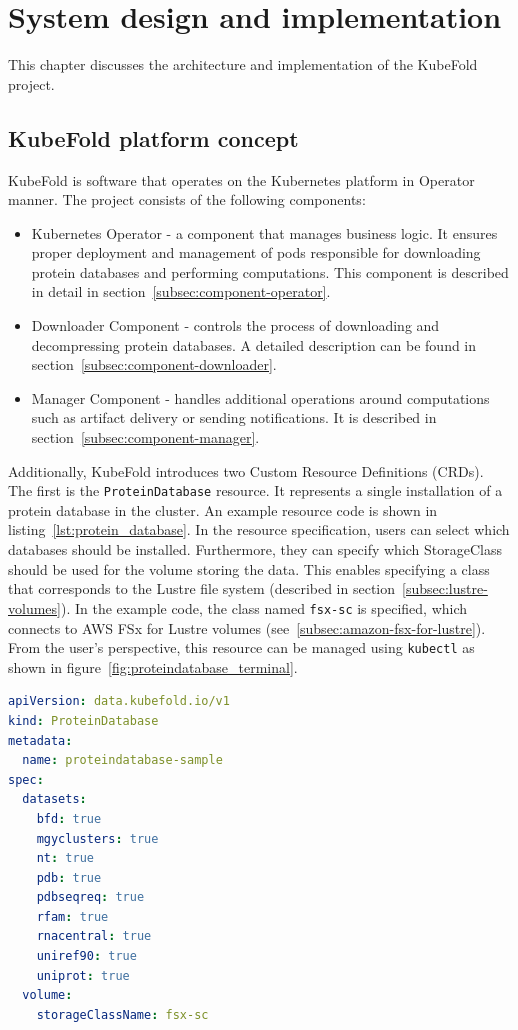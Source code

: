 \chapter{System design and implementation}
This chapter discusses the architecture and implementation of the KubeFold project.


\section{KubeFold platform concept}
KubeFold is software that operates on the Kubernetes platform in Operator manner.
The project consists of the following components:
\begin{itemize}
    \item Kubernetes Operator - a component that manages business logic.
    It ensures proper deployment and management of pods responsible for downloading protein databases and performing computations.
    This component is described in detail in section~\ref{subsec:component-operator}.
    \item Downloader Component - controls the process of downloading and decompressing protein databases.
    A detailed description can be found in section~\ref{subsec:component-downloader}.
    \item Manager Component - handles additional operations around computations such as artifact delivery or sending notifications.
    It is described in section~\ref{subsec:component-manager}.
\end{itemize}

Additionally, KubeFold introduces two Custom Resource Definitions (CRDs).
The first is the \texttt{ProteinDatabase} resource.
It represents a single installation of a protein database in the cluster.
An example resource code is shown in listing~\ref{lst:protein_database}.
In the resource specification, users can select which databases should be installed.
Furthermore, they can specify which StorageClass should be used for the volume storing the data.
This enables specifying a class that corresponds to the Lustre file system (described in section~\ref{subsec:lustre-volumes}).
In the example code, the class named \texttt{fsx-sc} is specified, which connects to AWS FSx for Lustre volumes (see~\ref{subsec:amazon-fsx-for-lustre}).
From the user's perspective, this resource can be managed using \texttt{kubectl} as shown in figure~\ref{fig:proteindatabase_terminal}.

\begin{lstlisting}[language=yaml,caption={Example \texttt{ProteinDatabase} resource definition},label={lst:protein_database}]
apiVersion: data.kubefold.io/v1
kind: ProteinDatabase
metadata:
  name: proteindatabase-sample
spec:
  datasets:
    bfd: true
    mgyclusters: true
    nt: true
    pdb: true
    pdbseqreq: true
    rfam: true
    rnacentral: true
    uniref90: true
    uniprot: true
  volume:
    storageClassName: fsx-sc
\end{lstlisting}

